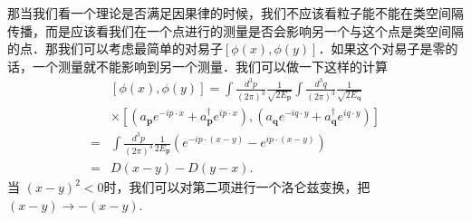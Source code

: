 那当我们看一个理论是否满足因果律的时候，我们不应该看粒子能不能在类空间隔传播，而是应该看我们在一个点进行的测量是否会影响另一个与这个点是类空间隔的点．那我们可以考虑最简单的对易子$[\phi(x),\phi(y)]$．如果这个对易子是零的话，一个测量就不能影响到另一个测量．我们可以做一下这样的计算
\begin{equation}
\begin{aligned}
&[\phi(x), \phi(y)]=\int \frac{d^{3} p}{(2 \pi)^{3}} \frac{1}{\sqrt{2 E_{\mathbf{p}}}} \int \frac{d^{3} q}{(2 \pi)^{3}} \frac{1}{\sqrt{2 E_{\mathbf{q}}}} \\
&\times\left[\left(a_{\mathbf{p}} e^{-i p \cdot x}+a_{\mathbf{p}}^{\dagger} e^{i p \cdot x}\right),\left(a_{\mathbf{q}} e^{-i q \cdot y}+a_{\mathbf{q}}^{\dagger} e^{i q \cdot y}\right)\right] \\
=& \int \frac{d^{3} p}{(2 \pi)^{3}} \frac{1}{2 E_{\mathbf{p}}}\left(e^{-i p \cdot(x-y)}-e^{i p \cdot(x-y)}\right) \\
=& D(x-y)-D(y-x) .
\end{aligned}
\end{equation}
当 $(x-y)^2<0$时，我们可以对第二项进行一个洛仑兹变换，把$(x-y)\rightarrow -(x-y)$.

